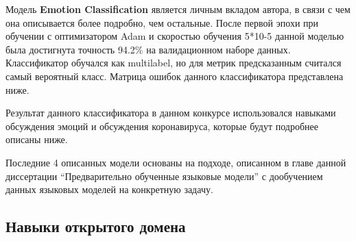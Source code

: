 Модель \textbf{Emotion Classification} является личным вкладом автора, в связи с чем она описывается более подробно, чем остальные. После первой эпохи при обучении с оптимизатором Adam и скоростью обучения 5*10-5 данной моделью была достигнута точность 94.2\% на валидационном наборе данных. Классификатор обучался как multilabel, но для метрик предсказанным считался самый вероятный класс. Матрица ошибок данного классификатора представлена ниже.


\begin{table}[htbp]
\centering
\caption {Матрица ошибок классификатора эмоций из Alexa Prize Challenge 3}
\label{tab:dream1}%
\end{table}



Результат данного классификатора в данном конкурсе использовался навыками обсуждения эмоций и обсуждения коронавируса, которые будут подробнее описаны ниже.

Последние 4 описанных модели основаны на подходе, описанном в главе данной диссертации “Предварительно обученные языковые модели” с дообучением данных языковых моделей на конкретную задачу. 

\subsection{Навыки открытого домена}

